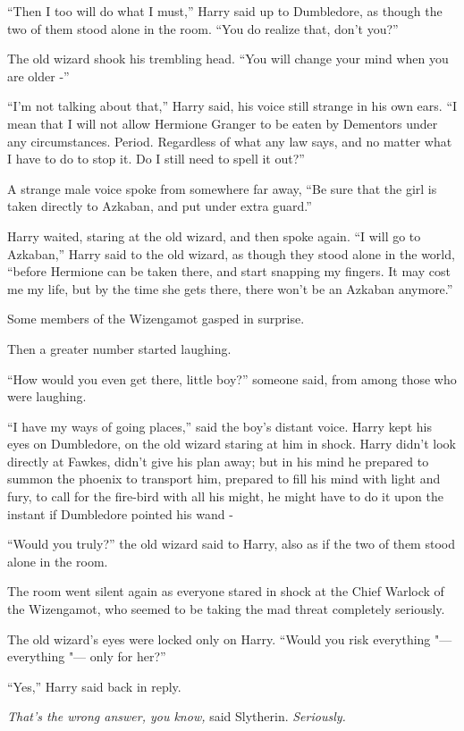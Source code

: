 ``Then I too will do what I must,'' Harry said up to Dumbledore, as
though the two of them stood alone in the room. ``You do realize that,
don't you?''

The old wizard shook his trembling head. ``You will change your mind
when you are older -''

``I'm not talking about that,'' Harry said, his voice still strange in
his own ears. ``I mean that I will not allow Hermione Granger to be
eaten by Dementors under any circumstances. Period. Regardless of what
any law says, and no matter what I have to do to stop it. Do I still
need to spell it out?''

A strange male voice spoke from somewhere far away, ``Be sure that the
girl is taken directly to Azkaban, and put under extra guard.''

Harry waited, staring at the old wizard, and then spoke again. ``I will
go to Azkaban,'' Harry said to the old wizard, as though they stood
alone in the world, ``before Hermione can be taken there, and start
snapping my fingers. It may cost me my life, but by the time she gets
there, there won't be an Azkaban anymore.''

Some members of the Wizengamot gasped in surprise.

Then a greater number started laughing.

``How would you even get there, little boy?'' someone said, from among
those who were laughing.

``I have my ways of going places,'' said the boy's distant voice. Harry
kept his eyes on Dumbledore, on the old wizard staring at him in shock.
Harry didn't look directly at Fawkes, didn't give his plan away; but in
his mind he prepared to summon the phoenix to transport him, prepared to
fill his mind with light and fury, to call for the fire-bird with all
his might, he might have to do it upon the instant if Dumbledore pointed
his wand -

``Would you truly?'' the old wizard said to Harry, also as if the two of
them stood alone in the room.

The room went silent again as everyone stared in shock at the Chief
Warlock of the Wizengamot, who seemed to be taking the mad threat
completely seriously.

The old wizard's eyes were locked only on Harry. ``Would you risk
everything "--- everything "--- only for her?''

``Yes,'' Harry said back in reply.

\emph{That's the wrong answer, you know,} said Slytherin.
\emph{Seriously.}


